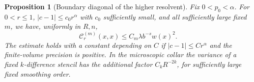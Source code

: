 \documentclass[11pt]{article}
\newtheorem{proposition}[theorem]{Proposition}
\theoremstyle{definition}
\begin{document}
\begin{proposition}[Boundary diagonal of the higher resolvent]
\label{prop:boundary-resolvent-diagonal}
Fix \(0<p_0<\alpha\). For \(0<r\le1\),
\(|c-1|\le c_0r^\alpha\) with \(c_0\) sufficiently small, and
all sufficiently large fixed \(m\), we have, uniformly in \(R,n\),
\begin{equation}
 \mathcal C_r^{(m)}(x,x)\le C_m\lambda b^{-s}w(x)^2.
\end{equation}
The estimate holds with a constant depending on \(C\) if
\(|c-1|\le C r^\alpha\) and the finite-volume precision is positive.
In the microscopic collar the variance of a fixed \(k\)-difference
stencil has the additional factor \(C_k R^{-2k}\), for sufficiently
large fixed smoothing order.
\end{proposition}
\end{document}
